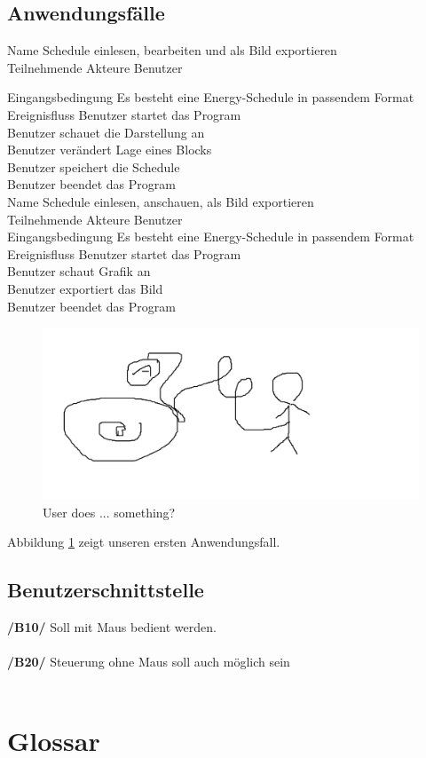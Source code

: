 \documentclass[parskip=full]{scrartcl}
\begin{document}
		\subsection{Anwendungsfälle}
		
		Name Schedule einlesen, bearbeiten und als Bild exportieren\\
		Teilnehmende Akteure Benutzer
		
		Eingangsbedingung Es besteht eine Energy-Schedule in passendem Format
		Ereignisfluss Benutzer startet das Program\\
		Benutzer schauet die Darstellung an\\
		Benutzer verändert Lage eines Blocks\\
		Benutzer speichert die Schedule\\
		Benutzer beendet das Program\\
		
		Name Schedule einlesen, anschauen, als Bild exportieren\\
		Teilnehmende Akteure Benutzer\\
		Eingangsbedingung Es besteht eine Energy-Schedule in passendem Format\\
		Ereignisfluss Benutzer startet das Program\\
		Benutzer schaut Grafik an\\
		Benutzer exportiert das Bild\\
		Benutzer beendet das Program\\
			\begin{figure}[h!]
			
				\includegraphics[width=\linewidth]{img/usecase1.jpg}
				\caption{User does ... something?}
				\label{fig:uc1}
				
			\end{figure}
			
			Abbildung \ref{fig:uc1} zeigt unseren ersten Anwendungsfall.
			
		\subsection{Benutzerschnittstelle}


			\textbf{/B10/} Soll mit Maus bedient werden.\\\\
			
			\textbf{/B20/} Steuerung ohne Maus soll auch möglich sein\\\\
			
			
	\section{Glossar}
	
\end{document}
